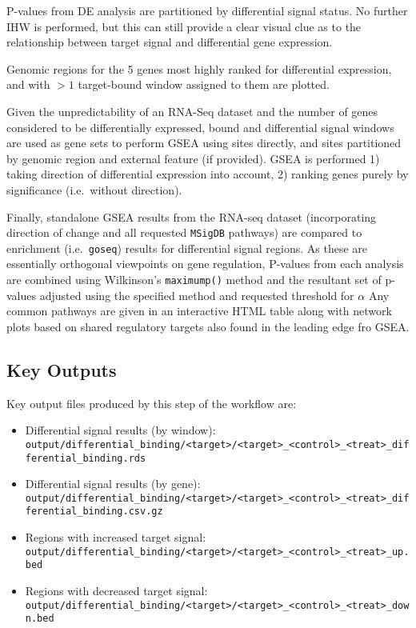 \documentclass[
]{book}
\providecommand{\tightlist}{%
  \setlength{\itemsep}{0pt}\setlength{\parskip}{0pt}}
\begin{document}
P-values from DE analysis are partitioned by differential signal status.
No further IHW is performed, but this can still provide a clear visual clue as to the relationship between target signal and differential gene expression.

Genomic regions for the 5 genes most highly ranked for differential expression, and with \(>1\) target-bound window assigned to them are plotted.

Given the unpredictability of an RNA-Seq dataset and the number of genes considered to be differentially expressed, bound and differential signal windows are used as gene sets to perform GSEA\citep{fgsea} using sites directly, and sites partitioned by genomic region and external feature (if provided).
GSEA is performed 1) taking direction of differential expression into account, 2) ranking genes purely by significance (i.e.~without direction).

Finally, standalone GSEA results from the RNA-seq dataset (incorporating direction of change and all requested \texttt{MSigDB} pathways) are compared to enrichment (i.e.~\texttt{goseq}) results for differential signal regions.
As these are essentially orthogonal viewpoints on gene regulation, P-values from each analysis are combined using Wilkinson's \texttt{maximump()} method and the resultant set of p-values adjusted using the specified method and requested threshold for \(\alpha\)
Any common pathways are given in an interactive HTML table along with network plots based on shared regulatory targets also found in the leading edge fro GSEA.

\hypertarget{key-outputs-1}{%
\subsection*{Key Outputs}\label{key-outputs-1}}

Key output files produced by this step of the workflow are:

\begin{itemize}
\tightlist
\item
  Differential signal results (by window): \texttt{output/differential\_binding/\textless{}target\textgreater{}/\textless{}target\textgreater{}\_\textless{}control\textgreater{}\_\textless{}treat\textgreater{}\_differential\_binding.rds}
\item
  Differential signal results (by gene): \texttt{output/differential\_binding/\textless{}target\textgreater{}/\textless{}target\textgreater{}\_\textless{}control\textgreater{}\_\textless{}treat\textgreater{}\_differential\_binding.csv.gz}
\item
  Regions with increased target signal: \texttt{output/differential\_binding/\textless{}target\textgreater{}/\textless{}target\textgreater{}\_\textless{}control\textgreater{}\_\textless{}treat\textgreater{}\_up.bed}
\item
  Regions with decreased target signal: \texttt{output/differential\_binding/\textless{}target\textgreater{}/\textless{}target\textgreater{}\_\textless{}control\textgreater{}\_\textless{}treat\textgreater{}\_down.bed}
\end{itemize}
\end{document}
